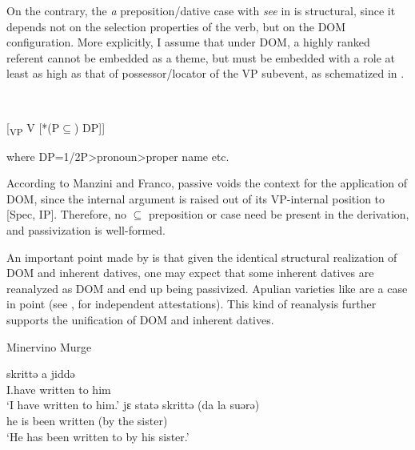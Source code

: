 \documentclass[output=paper]{langscibook}
\begin{document}
On the contrary, the \textit{a} preposition/dative case with \textit{see} in  is structural, since it depends not on the selection properties of the verb, but on the DOM configuration. More explicitly, I assume that under DOM, a highly ranked referent cannot be embedded as a theme, but must be embedded with a role at least as high as that of possessor/locator of the VP subevent, as schematized in . 

\ea\label{ex:manzini:}
{} \\
\z

[\textsubscript{VP} V   [*(P${\subseteq}$) DP]]    


where DP=1/2P>pronoun>proper name etc.

According to Manzini and Franco, passive voids the context for the application of DOM, since the internal argument is raised out of its VP-internal position to [Spec, IP]. Therefore, no ${\subseteq}$ preposition or case need be present in the derivation, and passivization is well-formed.  

An important point made by \citet{Pineda2016} is that given the identical structural realization of DOM and inherent datives, one may expect that some inherent datives are reanalyzed as DOM and end up being passivized. Apulian varieties like  are a case in point (see \citealt{Loporcaro1988}, \citealt{Ledgeway2000} for independent attestations). This kind of reanalysis further supports the unification of DOM and inherent datives.  

\ea\label{ex:manzini:}
{Minervino Murge}\\
\begin{xlist}
\ex {}   {skrittə}   {a} {jiddə}\\
I.have  written  to him\\
\glt ‘I have written to him.’
\ex {}   {jɛ}   {statə}   {skrittə}   (da la suərə)\\
he  is  been   written (by the sister)\\
\glt ‘He has been written to by his sister.’
\end{xlist}
\z
\end{document}

